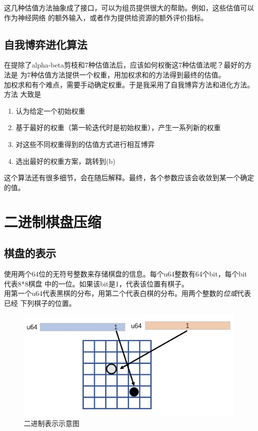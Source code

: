 \documentclass[a4paper]{article}
\begin{document}
这几种估值方法抽象成了接口，可以为组员提供很大的帮助。例如，这些估值可以作为神经网络
的额外输入，或者作为提供给资源的额外评价指标。
\subsection{自我博弈进化算法}
在提除了alpha-beta剪枝和7种估值法后，应该如何权衡这7种估值法呢？最好的方法是
为7种估值方法提供一个权重，用加权求和的方法得到最终的估值。\\


加权求和有个难点，需要手动确定权重。于是我采用了自我博弈方法和进化方法。方法
大致是
\begin{enumerate}[label=(\alph*)]
    \item 认为给定一个初始权重
    \item 基于最好的权重（第一轮迭代时是初始权重），产生一系列新的权重
    \item 对这些不同权重得到的估值方式进行相互博弈
    \item 选出最好的权重方案，跳转到(b)
\end{enumerate}
这个算法还有很多细节，会在随后解释。最终，各个参数应该会收敛到某一个确定的值。
\section{二进制棋盘压缩}
\subsection{棋盘的表示}
使用两个64位的无符号整数来存储棋盘的信息。每个u64整数有64个bit，每个bit代表8*8棋盘
中的一位。如果该bit是1，代表该位置有棋子。\\

用第一个u64代表黑棋的分布，用第二个代表白棋的分布。用两个整数的\emph{位或}代表已经
下列棋子的位置。
\begin{figure}[!hbt]
    \begin{center}
    \includegraphics[scale=0.4]{assets/ill.png}
    \caption{二进制表示示意图\label{fig:label}} 
    \end{center} 
\end{figure} 
\end{document}

